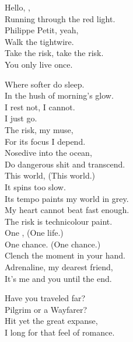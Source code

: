 
Hello, , \\
Running through the red light. \\
Philippe Petit, yeah, \\
Walk the tightwire. \\
Take the risk, take the risk. \\
You only live once. \\


Where softer  do sleep. \\
In the hush of morning's glow. \\
I rest not, I cannot. \\
I just go. \\

The risk, my muse, \\
For its focus I depend. \\
Nosedive into the ocean, \\
Do dangerous shit and transcend. \\
This world, (This world.) \\
It spins too slow. \\
Its tempo paints my world in grey. \\
My heart cannot beat fast enough. \\
The risk is technicolour paint. \\

One , (One life.) \\
One chance. (One chance.) \\
Clench the moment in your hand. \\
Adrenaline, my dearest friend, \\
It's me and you until the end. \\




Have you traveled far? \\
Pilgrim or a Wayfarer? \\
Hit yet the great expanse, \\
I long for that feel of romance. \\


